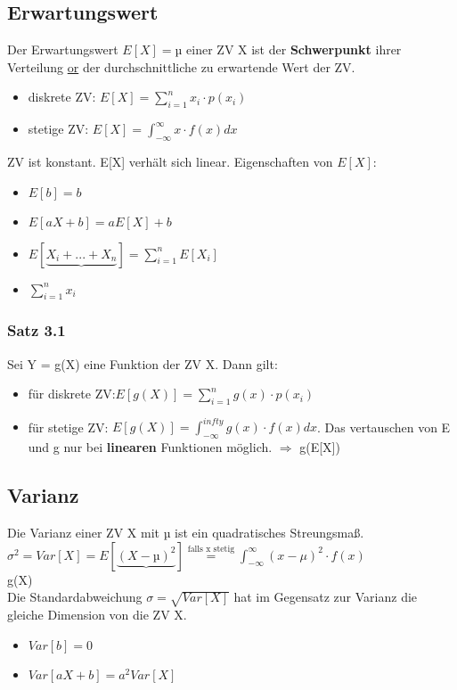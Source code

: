 \subsection{Erwartungswert}
Der Erwartungswert $E[X] = µ$ einer ZV X ist der \textbf{Schwerpunkt} ihrer Verteilung \underline{or} der durchschnittliche zu erwartende Wert der ZV.
\begin{itemize}
  \item diskrete ZV: $E[X] = \sum_{i=1}^{n} x_{i} \cdot p(x_{i})$
  \item stetige ZV: $E[X] = \int_{-\infty}^{\infty} x \cdot f(x) dx$
\end{itemize}
ZV ist konstant. E[X] verhält sich linear. Eigenschaften von $E[X]$:
\begin{itemize}
  \item $E[b] = b$
  \item $E[aX + b] = aE[X] + b$
  \item $E[\underbrace{X_{i} + ... + X_{n}}] = \sum_{i=1}^{n} E[X_{i}]$
  \item $\sum_{i=1}^{n} x_{i}$
\end{itemize}
\subsubsection{Satz 3.1}
Sei Y = g(X) eine Funktion der ZV X. Dann gilt:
\begin{itemize}
  \item für diskrete ZV:$E[g(X)] = \sum_{i=1}^{n} g(x) \cdot p(x_ {i})$
  \item für stetige ZV: $E[g(X)] = \int_{-\infty}^{infty} g(x) \cdot f(x) dx$. Das vertauschen von E und g nur bei \textbf{linearen} Funktionen möglich. $\Rightarrow$ g(E[X])
\end{itemize}
\subsection{Varianz}
Die Varianz einer ZV X mit µ ist ein quadratisches Streungsmaß. $\sigma^2 = Var[X] = E[\underbrace{(X - µ)^2}] \stackrel{\text{falls x stetig}}{=} \int_{-\infty}^{\infty} (x-\mu)^2 \cdot f(x)$\\
g(X)\\
Die Standardabweichung $\sigma = \sqrt{Var[X]}$ hat im Gegensatz zur Varianz die gleiche Dimension von die ZV X.
\begin{itemize}
  \item $Var[b] = 0$
  \item $Var[aX + b] = a^2 Var[X]$
\end{itemize}
